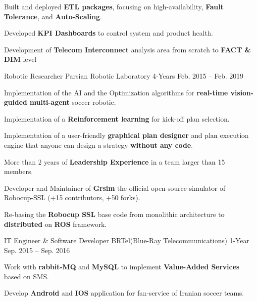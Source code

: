 \begin{cventries}
{\begin{cvitems}
        \item {Built and deployed \textbf{ETL packages}, focusing on high-availability, \textbf{Fault Tolerance}, and \textbf{Auto-Scaling}.}
        \item {Developed \textbf{KPI Dashboards} to control system and product health.}
        \item {Development of \textbf{Telecom Interconnect} analysis area from scratch to \textbf{FACT \& DIM} level}
      \end{cvitems}
    }
  \cventry
    {Robotic Researcher} %
    {Parsian Robotic Laboratory} %
    {4-Years} %
    {Feb. 2015 -- Feb. 2019} %
    {
      \begin{cvitems} %
        \item Implementation of the AI and the Optimization algorithms for \textbf{real-time vision-guided multi-agent} soccer robotic.
        \item Implementation of a \textbf{Reinforcement learning} for kick-off plan selection.
        \item Implementation of a user-friendly \textbf{graphical plan designer} and plan execution engine that anyone can design a strategy \textbf{without any code}.
        \item More than 2 years of \textbf{Leadership Experience} in a team larger than 15 members.
        \item Developer and Maintainer of \textbf{Grsim} the official open-source simulator of Robocup-SSL (+15 contributors, +50 forks).
        \item Re-basing the \textbf{Robocup SSL} base code from monolithic architecture to \textbf{distributed} on \textbf{ROS} framework.
      \end{cvitems}
    }

  \cventry
    {IT Engineer \& Software Developer} %
    {BRTel(Blue-Ray Telecommunications)} %
    {1-Year} %
    {Sep. 2015 -- Sep. 2016} %
    {
      \begin{cvitems} %
        \item {Work with \textbf{rabbit-MQ} and \textbf{MySQL} to implement \textbf{Value-Added Services} based on SMS.}
        \item {Develop \textbf{Android} and \textbf{IOS} application for fan-service of Iranian soccer teams.}
      \end{cvitems}
    }


\end{cventries}
